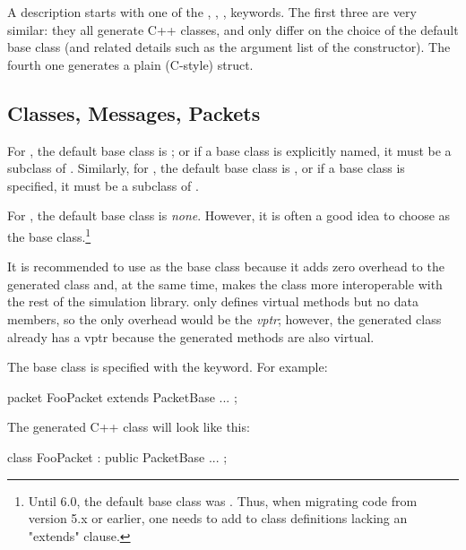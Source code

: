 A description starts with one of the , ,
,  keywords. The first three are very
similar: they all generate C++ classes, and only differ on the
choice of the default base class (and related details such as the argument list of the
constructor). The fourth one generates a plain (C-style) struct.


\subsection{Classes, Messages, Packets}
\label{sec:msg-defs:classes-messages-packets}
\label{sec:msg-defs:defining-classes}
\label{sec:msg-defs:messages-and-packets}
\label{sec:msg-defs:defining-messages-and-packets}

For , the default base class is ; or if a base
class is explicitly named, it must be a subclass of . Similarly,
for , the default base class is , or if a
base class is specified, it must be a subclass of .

For , the default base class is \textit{none}. However, it is often a
good idea to choose  as the base class.\footnote{Until {\omnetpp}
6.0, the default base class was . Thus, when migrating code from
version 5.x or earlier, one needs to add  to class
definitions lacking an "extends" clause.}

\begin{note}
  It is recommended to use  as the base class because it adds zero
  overhead to the generated class and, at the same time, makes the class more
  interoperable with the rest of the simulation library. 
  only defines virtual methods but no data members, so the only overhead would
  be the \textit{vptr}; however, the generated class already has a vptr because
  the generated methods are also virtual.
\end{note}

The base class is specified with the  keyword. For example:

\begin{msg}
packet FooPacket extends PacketBase
{
    ...
};
\end{msg}

The generated C++ class will look like this:

\begin{cpp}
class FooPacket : public PacketBase {
    ...
};
\end{cpp}

